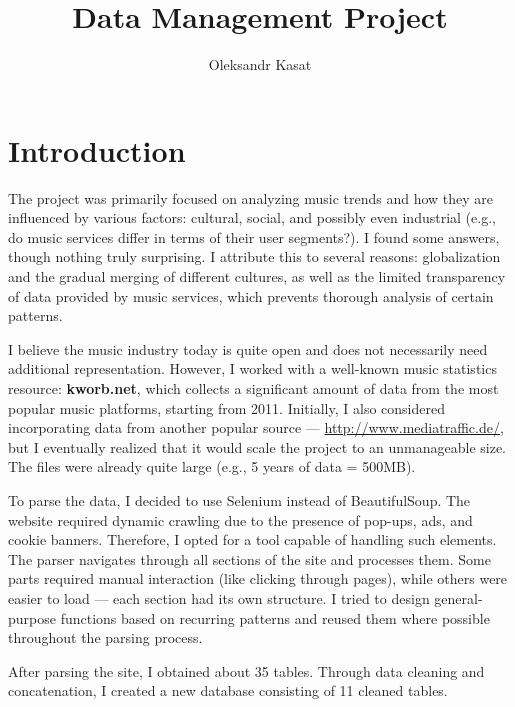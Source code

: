 \documentclass{article}
\title{Data Management Project}
\author{Oleksandr Kasat}
\date{}
\begin{document}
\maketitle

\section*{Introduction}

The project was primarily focused on analyzing music trends and how they are influenced by various factors: cultural, social, and possibly even industrial (e.g., do music services differ in terms of their user segments?). I found some answers, though nothing truly surprising. I attribute this to several reasons: globalization and the gradual merging of different cultures, as well as the limited transparency of data provided by music services, which prevents thorough analysis of certain patterns.

I believe the music industry today is quite open and does not necessarily need additional representation. However, I worked with a well-known music statistics resource: \textbf{kworb.net}, which collects a significant amount of data from the most popular music platforms, starting from 2011. Initially, I also considered incorporating data from another popular source — \url{http://www.mediatraffic.de/}, but I eventually realized that it would scale the project to an unmanageable size. The files were already quite large (e.g., 5 years of data = 500MB).

To parse the data, I decided to use Selenium instead of BeautifulSoup. The website required dynamic crawling due to the presence of pop-ups, ads, and cookie banners. Therefore, I opted for a tool capable of handling such elements. The parser navigates through all sections of the site and processes them. Some parts required manual interaction (like clicking through pages), while others were easier to load — each section had its own structure. I tried to design general-purpose functions based on recurring patterns and reused them where possible throughout the parsing process.

After parsing the site, I obtained about 35 tables. Through data cleaning and concatenation, I created a new database consisting of 11 cleaned tables.
\end{document}
